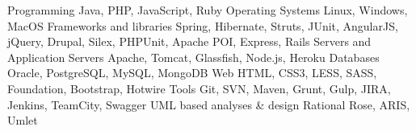 

\begin{cvskills}

  \cvskill
    {Programming} %
    {Java, PHP, JavaScript, Ruby} %
  \cvskill
    {Operating Systems} %
    {Linux, Windows, MacOS} %
  \cvskill
    {Frameworks and libraries} %
    {Spring, Hibernate, Struts, JUnit, AngularJS, jQuery, Drupal, Silex, PHPUnit, Apache POI, Express, Rails} %
  \cvskill
    {Servers and Application Servers} %
    {Apache, Tomcat, Glassfish, Node.js, Heroku} %
  \cvskill
    {Databases} %
    {Oracle, PostgreSQL, MySQL, MongoDB} %
  \cvskill
    {Web} %
    {HTML, CSS3, LESS, SASS, Foundation, Bootstrap, Hotwire} %
  \cvskill
    {Tools} %
    {Git, SVN, Maven, Grunt, Gulp, JIRA, Jenkins, TeamCity, Swagger} %
  \cvskill
    {UML based analyses \& design} %
    {Rational Rose, ARIS, Umlet} %
\end{cvskills}
